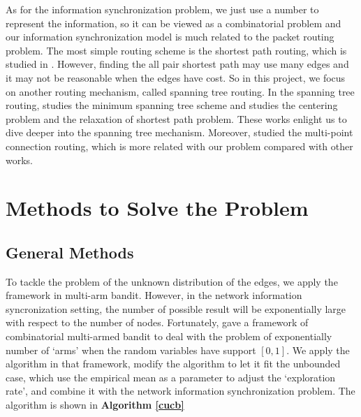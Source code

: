 \documentclass{article}
\theoremstyle{plain}
\theoremstyle{definition}
\theoremstyle{remark}
\begin{document}
    As for the information synchronization problem, we just use a number to represent the information, so it can be viewed as a combinatorial problem and our information synchronization model is much related to the packet routing problem. The most simple routing scheme is the shortest path routing, which is studied in \citet{ahn2002genetic,wang1992analysis}. However, finding the all pair shortest path may use many edges and it may not be reasonable when the edges have cost. So in this project, we focus on another routing mechanism, called spanning tree routing. In the spanning tree routing, \citet{huang2006dynamic} studies the minimum spanning tree scheme and \citet{christofides1981exact} studies the centering problem and the relaxation of shortest path problem. These works enlight us to dive deeper into the spanning tree mechanism. Moreover, \cite{waxman1988routing} studied the multi-point connection routing, which is more related with our problem compared with other works.

    \section{Methods to Solve the Problem}
    \subsection{General Methods}
    To tackle the problem of the unknown distribution of the edges, we apply the framework in multi-arm bandit. However, in the network information syncronization setting, the number of possible result will be exponentially large with respect to the number of nodes. Fortunately, \citet{pmlr-v28-chen13a} gave a framework of combinatorial multi-armed bandit to deal with the problem of exponentially number of `arms' when the random variables have support $[0,1]$. We apply the algorithm in that framework, modify the algorithm to let it fit the unbounded case, which use the empirical mean as a parameter to adjust the `exploration rate', and combine it with the network information synchronization problem. The algorithm is shown in \textbf{Algorithm \ref{cucb}}
\end{document}
